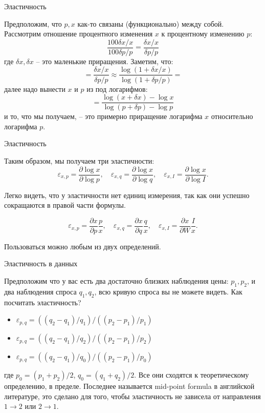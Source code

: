 \documentclass{beamer}
\begin{document}
\begin{frame}{Эластичность}

Предположим, что $p,x$ как-то связаны (функционально) между собой. Рассмотрим отношение процентного изменения $x$ к процентному изменению $p$:
$$\frac{100 \delta x / x}{100 \delta p / p}=\frac{\delta x / x}{\delta p / p}$$
где $\delta x, \delta x$ – это маленькие приращения. Заметим, что:
$$=\frac{\delta x / x}{\delta p / p} \approx \frac{\log(1 + \delta x / x)}{\log(1 + \delta p / p)}=$$
далее надо вынести $x$ и $p$ из под логарифмов:
$$=\frac{\log(x + \delta x) - \log x}{\log(p + \delta p) - \log p}$$
и то, что мы получаем, – это примерно приращение логарифма $x$ относительно логарифма $p$.

\end{frame}

\begin{frame}{Эластичность}

Таким образом, мы получаем три эластичности:
$$\varepsilon_{x,p} = \frac{\partial \log x}{\partial \log p}, \quad \varepsilon_{x,q} = \frac{\partial \log x}{\partial \log q}, \quad \varepsilon_{x,I} = \frac{\partial \log x}{\partial \log I}.$$

Легко видеть, что у эластичности нет единиц измерения, так как они успешно сокращаются в правой части формулы. 

$$\varepsilon_{x,p} = \frac{\partial x}{\partial p}\frac{p}{x}, \quad \varepsilon_{x,q} = \frac{\partial x}{\partial q}\frac{q}{x}, \quad \varepsilon_{x,I} = \frac{\partial x}{\partial W}\frac{I}{x}.$$

Пользоваться можно любым из двух определений.

\end{frame}

\begin{frame}{Эластичность в данных}

Предположим что у вас есть два достаточно близких наблюдения цены: $p_1, p_2$, и два наблюдения спроса $q_1, q_2$, всю кривую спроса вы не можете видеть. Как посчитать эластичность?
	
	\begin{itemize}
	\item $\varepsilon_{p,q} = ((q_2 - q_1)/q_1)/((p_2-p_1)/p_1)$
	\item $\varepsilon_{p,q} = ((q_2 - q_1)/q_2)/((p_2-p_1)/p_2)$
	\item $\varepsilon_{p,q} = ((q_2 - q_1)/q_0)/((p_2-p_1)/p_0)$
	\end{itemize}
	
	где $p_0 = (p_1 + p_2)/2$, $q_0 = (q_1+q_2)/2$. Все они сходятся к теоретическому определению, в пределе. Последнее называется \alert{mid-point formula} в английской литературе, это сделано для того, чтобы эластичность не зависела от направления $1 \to 2$ или $2 \to 1$.
	
\end{frame}
\end{document}
